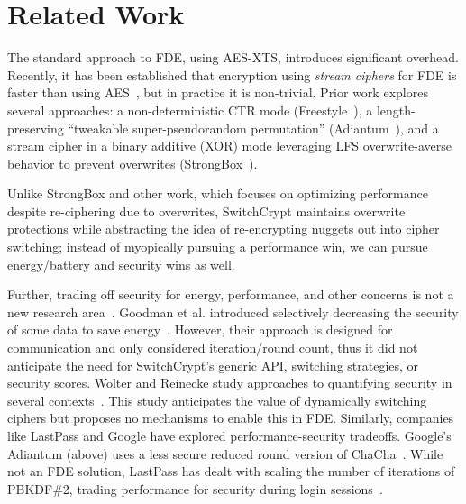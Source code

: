 \section{Related Work}\label{sec:related}

The standard approach to FDE, using AES-XTS, introduces significant overhead.
Recently, it has been established that encryption using \emph{stream ciphers}
for FDE is faster than using AES~\cite{StrongBox, AnotherPaper1, AnotherPaper2},
but in practice it is non-trivial. Prior work explores several approaches: a
non-deterministic CTR mode (Freestyle~\cite{Freestyle}), a length-preserving
``tweakable super-pseudorandom permutation'' (Adiantum~\cite{Adiantum}), and a
stream cipher in a binary additive (XOR) mode leveraging LFS overwrite-averse
behavior to prevent overwrites (StrongBox~\cite{StrongBox}).

Unlike StrongBox and other work, which focuses on optimizing performance despite
re-ciphering due to overwrites, SwitchCrypt maintains overwrite protections
while abstracting the idea of re-encrypting nuggets out into cipher switching;
instead of myopically pursuing a performance win, we can pursue energy/battery
and security wins as well.

Further, trading off security for energy, performance, and other concerns is not
a new research area~\cite{ScalableSecurity, WolterReinecke, ZengChow1,
ZengChow2, HaleemEtAl, LiOmiecinski}. Goodman et al. introduced selectively
decreasing the security of some data to save energy~\cite{ScalableSecurity}.
However, their approach is designed for communication and only considered
iteration/round count, thus it did not anticipate the need for SwitchCrypt's
generic API, switching strategies, or security scores. Wolter and Reinecke study
approaches to quantifying security in several contexts~\cite{WolterReinecke}.
This study anticipates the value of dynamically switching ciphers but proposes
no mechanisms to enable this in FDE. Similarly, companies like LastPass and
Google have explored performance-security tradeoffs. Google's Adiantum (above)
uses a less secure reduced round version of ChaCha~\cite{Adiantum}. While not an
FDE solution, LastPass has dealt with scaling the number of iterations of
PBKDF\#2, trading performance for security during login
sessions~\cite{LastPass}.
